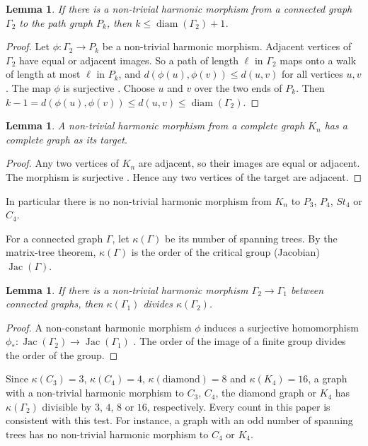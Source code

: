 \documentclass[12pt,letterpaper]{article}
\newtheorem{lemma}[theorem]{Lemma}
\theoremstyle{definition}
\DeclareMathOperator{\Jac}{Jac}
\begin{document}
\begin{lemma}
\label{lemma:diameter}
If there is a non-trivial harmonic morphism from a connected graph
$\Gamma_2$ to the path graph $P_k$, then $k\leq \operatorname{diam}(\Gamma_2)+1$.
\end{lemma}

\begin{proof}
Let $\phi:\Gamma_2\to P_k$ be a non-trivial harmonic morphism. Adjacent
vertices of $\Gamma_2$ have equal or adjacent images. So a path of length
$\ell$ in $\Gamma_2$ maps onto a walk of length at most $\ell$ in $P_k$, and
$d(\phi(u),\phi(v))\leq d(u,v)$ for all vertices $u,v$. The map $\phi$ is
surjective \cite[Lemma~2.7]{BN09}. Choose $u$ and $v$ over the two ends of
$P_k$. Then $k-1=d(\phi(u),\phi(v))\leq d(u,v)\leq\operatorname{diam}(\Gamma_2)$.
\end{proof}

\begin{lemma}
\label{lemma:complete}
A non-trivial harmonic morphism from a complete graph $K_n$ has a complete
graph as its target.
\end{lemma}

\begin{proof}
Any two vertices of $K_n$ are adjacent, so their images are equal or
adjacent. The morphism is surjective \cite[Lemma~2.7]{BN09}. Hence any two
vertices of the target are adjacent.
\end{proof}

In particular there is no non-trivial harmonic morphism from $K_n$ to
$P_3$, $P_4$, $St_4$ or $C_4$.

For a connected graph $\Gamma$, let $\kappa(\Gamma)$ be its number of
spanning trees. By the matrix-tree theorem, $\kappa(\Gamma)$ is the order of
the critical group (Jacobian) $\Jac(\Gamma)$.

\begin{lemma}
\label{lemma:jacobian}
If there is a non-trivial harmonic morphism $\Gamma_2\to\Gamma_1$ between
connected graphs, then $\kappa(\Gamma_1)$ divides $\kappa(\Gamma_2)$.
\end{lemma}

\begin{proof}
A non-constant harmonic morphism $\phi$ induces a surjective homomorphism
$\phi_*:\Jac(\Gamma_2)\to\Jac(\Gamma_1)$ \cite[Lemma~4.12]{BN09}. The order
of the image of a finite group divides the order of the group.
\end{proof}

Since $\kappa(C_3)=3$, $\kappa(C_4)=4$, $\kappa(\text{diamond})=8$ and
$\kappa(K_4)=16$, a graph with a non-trivial harmonic morphism to $C_3$, $C_4$,
the diamond graph or $K_4$ has $\kappa(\Gamma_2)$ divisible by $3$, $4$, $8$ or
$16$, respectively. Every count in this paper is consistent with this test.
For instance, a graph with an odd number of spanning trees has no
non-trivial harmonic morphism to $C_4$ or $K_4$.
\end{document}
